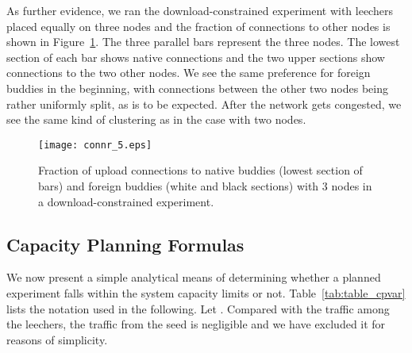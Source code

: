 \documentclass[10pt,letterpaper,twocolumn]{article}
\begin{document}
As further evidence, we ran the download-constrained experiment with
leechers placed equally on three nodes and the fraction of connections
to other nodes is shown in Figure~\ref{connr_5}. The three parallel
bars represent the three nodes. The lowest section of each bar shows
native connections and the two upper sections show connections to the
two other nodes. We see the same preference for foreign buddies in the
beginning, with connections between the other two nodes being rather
uniformly split, as is to be expected. After the network gets
congested, we see the same kind of clustering as in the case with two
nodes. 

\begin{figure}[!tb]
  \begin{center}
    \texttt{[image: connr\_5.eps]}
    \caption{Fraction of upload connections to native buddies (lowest
      section of bars) and foreign buddies (white and black sections)
      with 3 nodes in a download-constrained experiment.}
    \label{connr_5}
  \end{center}
\end{figure}






















\subsection{Capacity Planning Formulas}
\label{sec:capac-plann-form}

We now present a simple analytical means of determining whether a
planned experiment falls within the system capacity limits or not.
Table~\ref{tab:table_cpvar} lists the notation used in the
following. Let . Compared with the
traffic among the leechers, the traffic from the seed is negligible
and we have excluded it for reasons of simplicity.
\end{document}

